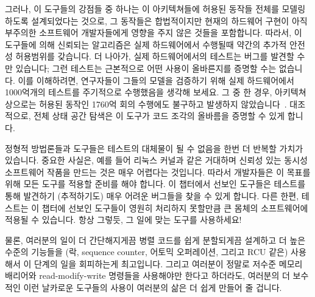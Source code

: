 그러나, 이 도구들의 강점들 중 하나는 이 아키텍쳐들에 허용된 동작들 전체를
모델링 하도록 설계되었다는 것으로, 그 동작들은 합법적이지만 현재의 하드웨어
구현이 아직 부주의한 소프트웨어 개발자들에게 영향을 주지 않은 것들을
포함합니다.
따라서, 이 도구들에 의해 신뢰되는 알고리즘은 실제 하드웨어에서 수행될때 약간의
추가적 안전성 허용범위를 갖습니다.
더 나아가, 실제 하드웨어에서의 테스트는 버그를 발견할 수만 있습니다; 그런
테스트는 근본적으로 어떤 사용이 올바른지를 증명할 수는 없습니다.
이를 이해하려면, 연구자들이 그들의 모델을 검증하기 위해 실제 하드웨어에서
1000억개의 테스트를 주기적으로 수행했음을 생각해 보세요.
그 중 한 경우, 아키텍쳐상으로는 허용된 동작인 1760억 회의 수행에도 불구하고
발생하지 않았습니다~\cite{JadeAlglave2011ppcmem}.
대조적으로, 전체 상태 공간 탐색은 이 도구가 코드 조각의 올바름을 증명할 수 있게
합니다.

\iffalse

That said, one strength of these tools is that they are designed to
model the full range of behaviors allowed by the architectures, including
behaviors that are legal, but which current hardware implementations do
not yet inflict on unwary software developers. Therefore, an algorithm
that is vetted by these tools likely has some additional safety margin
when running on real hardware. Furthermore, testing on real hardware can
only find bugs; such testing is inherently incapable of proving a given
usage correct. To appreciate this, consider that the researchers
routinely ran in excess of 100 billion test runs on real hardware to
validate their model.
In one case, behavior that is allowed by the architecture did not occur,
despite 176 billion runs~\cite{JadeAlglave2011ppcmem}.
In contrast, the
full-state-space search allows the tool to prove code fragments correct.

\fi

정형적 방법론들과 도구들은 테스트의 대체물이 될 수 없음을 한번 더 반복할 가치가
있습니다.
중요한 사실은, 예를 들어 리눅스 커널과 같은 거대하며 신뢰성 있는 동시성
소프트웨어 작품을 만드는 것은 매우 어렵다는 것입니다.
따라서 개발자들은 이 목표를 위해 모든 도구를 적용할 준비를 해야 합니다.
이 챕터에서 선보인 도구들은 테스트를 통해 발견하기 (추적하기도) 매우 어려운
버그들을 찾을 수 있게 합니다.
다른 한편, 테스트는 이 챕터에 선보인 도구들이 영원히 처리하지 못할만큼 큰
몸체의 소프트웨어에 적용될 수 있습니다.
항상 그렇듯, 그 일에 맞는 도구를 사용하세요!

물론, 여러분의 일이 더 간단해지게끔 병렬 코드를 쉽게 분할되게끔 설계하고 더
높은 수준의 기능들을 (락, sequence counter, 어토믹 오퍼레이션, 그리고 RCU 같은)
사용해서 이 단계의 일을 회피하는게 최고입니다.
그리고 여러분이 정말로 저수준 메모리 배리어와 read-modify-write 명령들을
사용해야만 한다고 하더라도, 여러분의 더 보수적인 이런 날카로운 도구들의 사용이
여러분의 삶은 더 쉽게 만들어 줄 겁니다.

